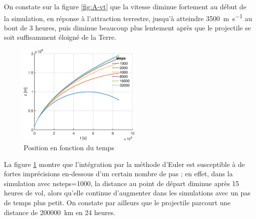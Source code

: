 \documentclass[a4paper,12pt,twoside]{article}
\begin{document}
On constate sur la figure \ref{fig:A-vt} que la vitesse diminue fortement au début de la simulation, en réponse à l'attraction terrestre, jusqu'à atteindre \SI{3500}{\meter\per\second} au bout de 3 heures, puis diminue beaucoup plus lentement après que le projectile se soit suffisamment éloigné de la Terre.\\

\begin{figure}[h]
	\centering
	\includegraphics[width=0.53\textwidth]{graphs/zA.eps}
	\caption{Position en fonction du temps}
	\label{fig:A-zt}
\end{figure}

La figure \ref{fig:A-zt} montre que l'intégration par la méthode d'Euler est susceptible à de fortes imprécisions en-dessous d'un certain nombre de pas ;
en effet, dans la simulation avec nsteps=1000, la distance au point de départ diminue après 15 heures de vol, alors qu'elle continue d'augmenter dans les simulations avec un pas de temps plus petit.
On constate par ailleurs que le projectile parcourt une distance de \SI{200000}{\kilo\meter} en 24 heures.\\
\end{document}
